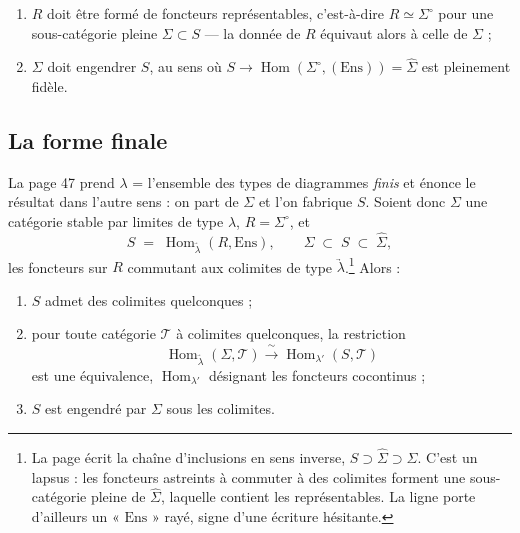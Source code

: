 \documentclass[11pt,a4paper]{article}
\begin{document}
\begin{enumerate}
\item[a)] $R$ doit être formé de foncteurs représentables, c'est-à-dire
$R \simeq \Sigma^{\circ}$ pour une sous-catégorie pleine $\Sigma \subset S$ —
la donnée de $R$ équivaut alors à celle de $\Sigma$ ;
\item[b)] $\Sigma$ doit engendrer $S$, au sens où
$S \to \operatorname{Hom}(\Sigma^{\circ}, (\mathrm{Ens})) = \widehat{\Sigma}$
est pleinement fidèle.
\end{enumerate}

\subsection*{La forme finale}

La page 47 prend $\lambda$ = l'ensemble des types de diagrammes \emph{finis} et
énonce le résultat dans l'autre sens : on part de $\Sigma$ et l'on fabrique
$S$. Soient donc $\Sigma$ une catégorie stable par limites de type $\lambda$,
$R = \Sigma^{\circ}$, et
\[
S \;=\; \operatorname{Hom}_{\underrightarrow{\lambda}}(R, \mathrm{Ens}),
\qquad \Sigma \;\subset\; S \;\subset\; \widehat{\Sigma},
\]
les foncteurs sur $R$ commutant aux colimites de type
$\underrightarrow{\lambda}$.\footnote{La page écrit la chaîne d'inclusions en
sens inverse, $S \supset \widehat{\Sigma} \supset \Sigma$. C'est un lapsus :
les foncteurs astreints à commuter à des colimites forment une sous-catégorie
pleine de $\widehat{\Sigma}$, laquelle contient les représentables. La ligne
porte d'ailleurs un « $\mathrm{Ens}$ » rayé, signe d'une écriture hésitante.}
Alors :

\begin{enumerate}
\item[a)] $S$ admet des colimites quelconques ;
\item[b)] pour toute catégorie $\mathcal{T}$ à colimites quelconques, la
restriction
\[
\operatorname{Hom}_{\underrightarrow{\lambda}}(\Sigma, \mathcal{T})
\xrightarrow{\ \sim\ } \operatorname{Hom}_{\lambda'}(S, \mathcal{T})
\]
est une équivalence, $\operatorname{Hom}_{\lambda'}$ désignant les foncteurs
cocontinus ;
\item[c)] $S$ est engendré par $\Sigma$ sous les colimites.
\end{enumerate}
\end{document}
